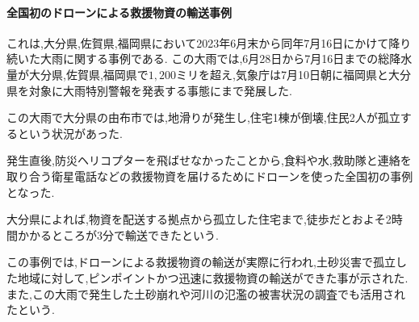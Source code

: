 \documentclass{article}[jsarticle]
\begin{document}
\paragraph{全国初のドローンによる救援物資の輸送事例}
これは,大分県,佐賀県,福岡県において2023年6月末から同年7月16日にかけて降り続いた大雨に関する事例である.
この大雨では,6月28日から7月16日までの総降水量が大分県,佐賀県,福岡県で$1,200$ミリを超え,気象庁は7月10日朝に福岡県と大分県を対象に大雨特別警報を発表する事態にまで発展した.\par
この大雨で大分県の由布市では,地滑りが発生し,住宅1棟が倒壊,住民2人が孤立するという状況があった.\par 
発生直後,防災ヘリコプターを飛ばせなかったことから,食料や水,救助隊と連絡を取り合う衛星電話などの救援物資を届けるためにドローンを使った全国初の事例となった.\par 
大分県によれば,物資を配送する拠点から孤立した住宅まで,徒歩だとおよそ2時間かかるところが3分で輸送できたという.\par
この事例では,ドローンによる救援物資の輸送が実際に行われ,土砂災害で孤立した地域に対して,ピンポイントかつ迅速に救援物資の輸送ができた事が示された.
また,この大雨で発生した土砂崩れや河川の氾濫の被害状況の調査でも活用されたという.
\end{document}
